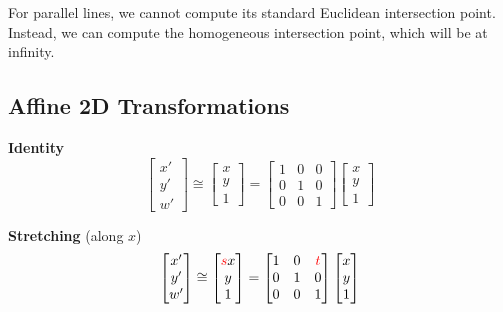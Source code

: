 \begin{remark}
    For parallel lines, we cannot compute its standard Euclidean intersection point. Instead, we can compute the homogeneous intersection point, which will be at infinity.
\end{remark}

\subsection{Affine 2D Transformations}

\begin{listu}
    \item \textbf{Identity} \[
        \begin{bmatrix}
            x' \\ y' \\ w'
        \end{bmatrix} \cong \begin{bmatrix}
            x \\ y \\ 1
        \end{bmatrix} = \begin{bmatrix}
            1 & 0 & 0 \\
            0 & 1 & 0 \\
            0 & 0 & 1
        \end{bmatrix} \begin{bmatrix}
            x \\ y \\ 1
        \end{bmatrix}
    \]

    \item \textbf{Stretching} (along $x$) \[
        \begin{bmatrix}
            x' \\ y' \\ w'
        \end{bmatrix} \cong \begin{bmatrix}
            {\color{red} s} x \\ y \\ 1
        \end{bmatrix} = \begin{bmatrix}
            1 & 0 & {\color{red} t} \\
            0 & 1 & 0 \\
            0 & 0 & 1
        \end{bmatrix} \begin{bmatrix}
            x \\ y \\ 1
        \end{bmatrix}
    \]
    

\end{listu}
